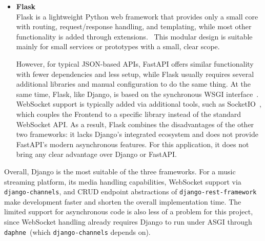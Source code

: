 \begin{itemize}
    However, some notable drawbacks include its opinionated design choices,
    which can make it hard to add custom logic.
    Furthermore, the size of the resulting codebase can be larger
    because the framework comes with many modules that may remain unused,
    while still taking up storage~(for example,
    RSS integration or server-side rendering modules).

    Finally, the main disadvantage is its limited support for asynchronous processing~\parencite{django_async}:
    many ORM operations (e.g., transactions), database connection management,
    and many third-party middlewares/libraries remain synchronous / async-unsafe.

    \item \textbf{Flask} \\
    Flask is a lightweight Python web framework that provides only a small core
    with routing, request/response handling, and templating, while most other
    functionality is added through extensions.~\parencite{flask}
    This modular design is suitable mainly for small services or prototypes
    with a small, clear scope.

    However, for typical JSON-based APIs, FastAPI offers similar functionality with fewer
    dependencies and less setup, while Flask usually requires several additional libraries
    and manual configuration to do the same thing.
    At the same time, Flask, like Django, is based on the synchronous WSGI interface~\parencite{pep3333_wsgi}.
    WebSocket support is typically added via additional tools, such as SocketIO~\parencite{socketio},
    which couples the Frontend to a specific library instead of the standard WebSocket API\@.
    As a result, Flask combines the disadvantages of the other two frameworks:
    it lacks Django's integrated ecosystem and
    does not provide FastAPI's modern asynchronous features.
    For this application, it does not bring any clear advantage over Django or FastAPI\@.
\end{itemize}

Overall, Django is the most suitable of the three frameworks.
For a music streaming platform, its media handling capabilities,
WebSocket support via \texttt{django-channels}, and CRUD endpoint abstractions
of \texttt{django-rest-framework} make development faster and shorten the overall
implementation time.
The limited support for asynchronous code is also less of a problem for this
project, since WebSocket handling already requires Django to run under ASGI through
\texttt{daphne}~(which \texttt{django-channels} depends on).


